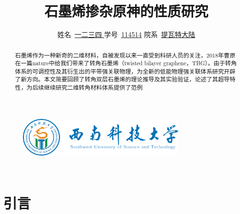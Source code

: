 \documentclass[hyperref,a4paper,UTF8]{ctexart}
\title{\textbf{{石墨烯掺杂原神的性质研究}}}
\author{
\kaishu\normalsize
姓名\ \underline{{一二三四 }
} \qquad
学号\ \underline{114514} \qquad
院系\ \underline{提瓦特大陆}
}
\date{} %
\begin{document}
\begin{figure}
    \centering
    \includegraphics[width=0.75\textwidth]{figures/swust.png}
\end{figure}

\maketitle

\begin{abstract}

石墨烯作为一种新奇的二维材料，自被发现以来一直受到科研人员的关注，2018年曹原在一篇nature中给我们带来了转角石墨烯（twisted bilayer graphene，TBG）。由于转角体系的可调控性及其衍生出的平带强关联物理，为全新的低能物理强关联体系研究开辟了新方向。本文简要回顾了转角双层石墨烯的理论推导及其实验验证，论述了其超导特性，为后续继续研究二维转角材料体系提供了范例

\end{abstract}

\

\tableofcontents

\thispagestyle{empty} %
\newpage


\section{引言}
\end{document}
